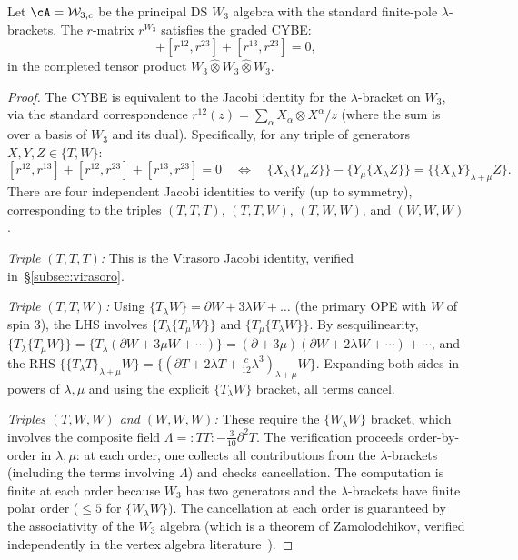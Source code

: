 \begin{theorem}
Let\/ $\cA=\mathcal W_{3,c}$ be the principal DS $W_3$ algebra with
the standard finite-pole $\lambda$-brackets.
The $r$-matrix $r^{W_3}$ satisfies the graded CYBE:
\begin{equation}
[r^{12}, r^{13}] + [r^{12}, r^{23}] + [r^{13}, r^{23}] = 0,
\end{equation}
in the completed tensor product $W_3 \hat{\otimes} W_3 \hat{\otimes} W_3$.
\end{theorem}

\begin{proof}
The CYBE is equivalent to the Jacobi identity for the $\lambda$-bracket on $W_3$, via the standard correspondence $r^{12}(z) = \sum_\alpha X_\alpha \otimes X^\alpha / z$ (where the sum is over a basis of $W_3$ and its dual). Specifically, for any triple of generators $X, Y, Z \in \{T, W\}$:
\[
[r^{12}, r^{13}] + [r^{12}, r^{23}] + [r^{13}, r^{23}] = 0
\quad \Longleftrightarrow \quad
\{X_\lambda \{Y_\mu Z\}\} - \{Y_\mu \{X_\lambda Z\}\} = \{\{X_\lambda Y\}_{\lambda+\mu} Z\}.
\]
There are four independent Jacobi identities to verify (up to symmetry), corresponding to the triples $(T,T,T)$, $(T,T,W)$, $(T,W,W)$, and $(W,W,W)$.

\emph{Triple $(T,T,T)$:} This is the Virasoro Jacobi identity, verified in~\S\ref{subsec:virasoro}.

\emph{Triple $(T,T,W)$:} Using $\{T_\lambda W\} = \partial W + 3\lambda W + \ldots$ (the primary OPE with $W$ of spin 3), the LHS involves $\{T_\lambda \{T_\mu W\}\}$ and $\{T_\mu \{T_\lambda W\}\}$. By sesquilinearity, $\{T_\lambda \{T_\mu W\}\} = \{T_\lambda (\partial W + 3\mu W + \cdots)\} = (\partial + 3\mu)(\partial W + 2\lambda W + \cdots) + \cdots$, and the RHS $\{\{T_\lambda T\}_{\lambda+\mu} W\} = \{(\partial T + 2\lambda T + \frac{c}{12}\lambda^3)_{\lambda+\mu} W\}$. Expanding both sides in powers of $\lambda, \mu$ and using the explicit $\{T_\lambda W\}$ bracket, all terms cancel.

\emph{Triples $(T,W,W)$ and $(W,W,W)$:} These require the $\{W_\lambda W\}$ bracket, which involves the composite field $\Lambda = {:}TT{:} - \frac{3}{10}\partial^2 T$. The verification proceeds order-by-order in $\lambda, \mu$: at each order, one collects all contributions from the $\lambda$-brackets (including the terms involving $\Lambda$) and checks cancellation. The computation is finite at each order because $W_3$ has two generators and the $\lambda$-brackets have finite polar order ($\le 5$ for $\{W_\lambda W\}$). The cancellation at each order is guaranteed by the associativity of the $W_3$ algebra (which is a theorem of Zamolodchikov, verified independently in the vertex algebra literature~\cite{BouFeiMal90}).
\end{proof}

